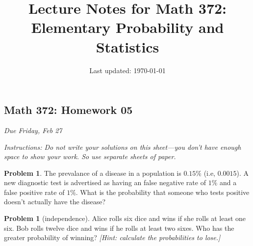 \documentclass[10pt]{article}
\title{Lecture Notes for Math 372: \\Elementary Probability and Statistics}
\date{Last updated: \today}
\theoremstyle{definition}
\newtheorem{problem}[theorem]{Problem}
\newcommand{\1}[1]{\textbf{1}_{\left[#1\right]}} %
\def\P{\mathbb{P}} %
\begin{document}
\begin{center}
  \section*{Math 372: Homework 05}
  \textit{Due Friday, Feb 27}
\end{center}

\textit{Instructions: Do not write your solutions on this sheet---you don't have enough space to show
your work. So use separate sheets of paper.}



\begin{problem}
  The prevalance of a disease in a population is $0.15\%$ (i.e, $0.0015$). A new diagnostic test is
  advertised as having an false negative rate of $1\%$ and a false positive rate of $1\%$. What is the
  probability that someone who tests positive doesn't actually have the disease?

  
\end{problem}


\begin{problem}[independence]
  Alice rolls six dice and wins if she rolls at least one six. Bob rolls
  twelve dice and wins if he rolls at least two sixes. Who has the greater
  probability of winning? \textit{[Hint: calculate the probabilities to lose.]}
\end{problem}
\end{document}
